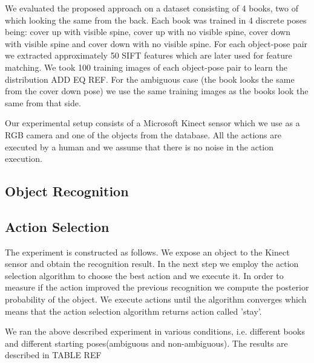 \documentclass[conference]{IEEEtran}
\begin{document}
    We evaluated the proposed approach on a dataset consisting of 4 books, two of which looking the same from the back. Each book was trained in 4 discrete poses being: cover up with visible spine, cover up with no visible spine, cover down with visible spine and cover down with no visible spine. For each object-pose pair we extracted approximately 50 SIFT features which are later used for feature matching. We took 100 training images of each object-pose pair to learn the distribution ADD EQ REF. For the ambiguous case (the book looks the same from the cover down pose) we use the same training images as the books look the same from that side.

    Our experimental setup consists of a Microsoft Kinect sensor which we use as a RGB camera and one of the objects from the database. All the actions are executed by a human and we assume that there is no noise in the action execution. 

    \subsection{Object Recognition}

    \subsection{Action Selection}
        The experiment is constructed as follows. We expose an object to the Kinect sensor and obtain the recognition result. In the next step we employ the action selection algorithm to choose the best action and we execute it. In order to measure if the action improved the previous recognition we compute the posterior probability of the object. We execute actions until the algorithm converges which means that the action selection algorithm returns action called 'stay'.

        We ran the above described experiment in various conditions, i.e. different books and different starting poses(ambiguous and non-ambiguous). The results are described in TABLE REF



\end{document}
